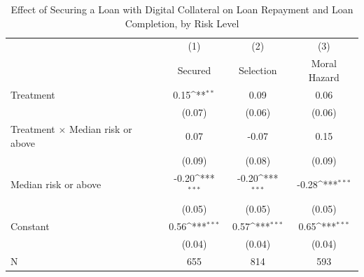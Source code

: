 \begin{table}[htbp]\centering
\def\sym#1{\ifmmode^{#1}\else\(^{#1}\)\fi}
\caption{Effect of Securing a Loan with Digital Collateral on Loan Repayment and Loan Completion, by Risk Level\label{LASMH\_complete\_riskinteract\_LATE}}
\begin{tabular}{l*{3}{c}}
\toprule
                    &\multicolumn{1}{c}{(1)}&\multicolumn{1}{c}{(2)}&\multicolumn{1}{c}{(3)}\\
                    &\multicolumn{1}{c}{Secured}&\multicolumn{1}{c}{Selection}&\multicolumn{1}{c}{Moral Hazard}\\
\midrule
Treatment           &        0.15\sym{**} &        0.09         &        0.06         \\
                    &      (0.07)         &      (0.06)         &      (0.06)         \\\addlinespace
Treatment $\times$ Median risk or above&        0.07         &       -0.07         &        0.15         \\
                    &      (0.09)         &      (0.08)         &      (0.09)         \\\addlinespace
Median risk or above&       -0.20\sym{***}&       -0.20\sym{***}&       -0.28\sym{***}\\
                    &      (0.05)         &      (0.05)         &      (0.05)         \\\addlinespace
Constant            &        0.56\sym{***}&        0.57\sym{***}&        0.65\sym{***}\\
                    &      (0.04)         &      (0.04)         &      (0.04)         \\\addlinespace
\midrule
N                   &         655         &         814         &         593         \\
\bottomrule
\end{tabular}
\end{table}
